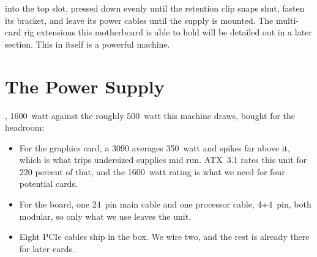  into the top slot, pressed down evenly until the retention clip snaps shut, fasten its bracket, and leave its power cables until the supply is
mounted. The multi-card rig extensions this motherboard is able to hold will be detailed out in a later section. This in itself is a powerful 
machine.








\section{The Power Supply}

, 1600~watt against the roughly
500~watt this machine draws, bought for the headroom\cite{asrockPG1600G}:


\begin{itemize}[topsep=0.25em, itemsep=0.4em, parsep=0em]
    \item For the graphics card, a 3090 averages 350~watt and spikes far above it,
    which is what trips undersized supplies mid run. ATX~3.1 rates this unit for
    220 percent of that, and the 1600~watt rating is what we need for four potential cards.
    \item For the board, one 24~pin main cable and one processor cable, 4+4~pin,
    both modular, so only what we use leaves the unit.
    \item Eight PCIe cables ship in the box. We wire two, and the rest is already
    there for later cards.
\end{itemize}

